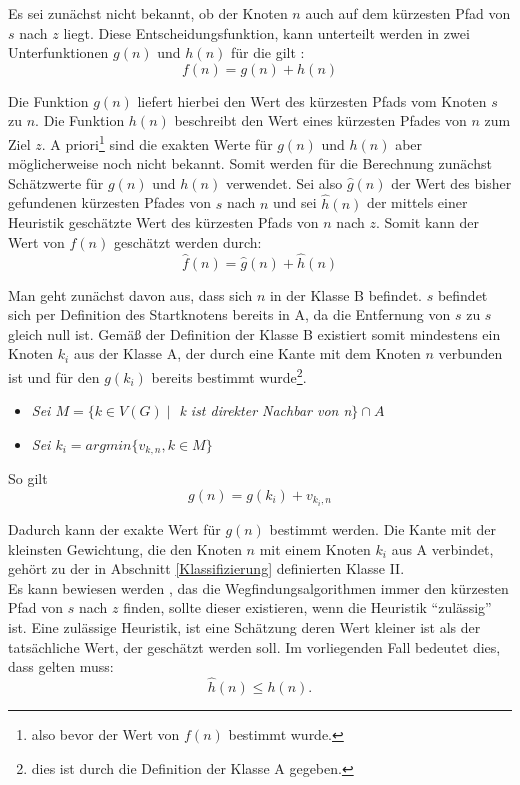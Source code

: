 		Es sei zunächst nicht bekannt, ob der Knoten $n$ auch auf dem kürzesten Pfad von $s$ nach $z$ liegt.
		Diese Entscheidungsfunktion, kann unterteilt werden in zwei Unterfunktionen $g(n)$ und $h(n)$ für die gilt \cite{Hart1968}:
		\begin{equation}
		f(n)=g(n)+h(n)
		\end{equation}
		
		Die Funktion $g(n)$ liefert hierbei den Wert des kürzesten Pfads vom Knoten $s$ zu $n$. Die Funktion $h(n)$ beschreibt den Wert eines kürzesten Pfades von $n$ zum Ziel $z$. A priori\footnote{also bevor der Wert von $f(n)$ bestimmt wurde.} sind die exakten Werte für $g(n)$ und $h(n)$ aber möglicherweise noch nicht bekannt. Somit werden für die Berechnung zunächst Schätzwerte für $g(n)$ und $h(n)$ verwendet. Sei also $\hat{g}(n)$ der Wert des bisher gefundenen kürzesten Pfades von $s$ nach $n$ und sei $\hat{h}(n)$ der mittels einer Heuristik geschätzte Wert des kürzesten Pfads von $n$ nach $z$. Somit kann der Wert von $f(n)$ geschätzt werden durch:
		\begin{equation}
			\hat{f}(n)=\hat{g}(n)+\hat{h}(n)
		\end{equation}
	
		Man geht zunächst davon aus, dass sich $n$ in der Klasse B befindet. $s$ befindet sich per Definition des Startknotens bereits in A, da die Entfernung von $s$ zu $s$ gleich null ist. Gemäß der Definition der Klasse B existiert somit mindestens ein Knoten $k_i$ aus der Klasse A, der durch eine Kante mit dem Knoten $n$ verbunden ist und für den $g(k_i)$ bereits bestimmt wurde\footnote{dies ist durch die Definition der Klasse A gegeben.}.
		\begin{itemize}
			\item \textit{Sei $M=\{k\in V(G)\mid$ k ist direkter Nachbar von n$\} \cap A$}
			\item \textit{Sei $k_i=argmin\{v_{k,n},k\in M\}$}
		\end{itemize}
		 So gilt
		\begin{equation}
			g(n)=g(k_i)+v_{k_i,n}
		\end{equation}
		
		Dadurch kann der exakte Wert für $g(n)$ bestimmt werden. Die Kante mit der kleinsten Gewichtung, die den Knoten $n$ mit einem Knoten $k_i$ aus A verbindet, gehört zu der in Abschnitt \ref{Klassifizierung} definierten Klasse II.\\
		Es kann bewiesen werden \cite{Hart1968}, das die Wegfindungsalgorithmen immer den kürzesten Pfad von $s$ nach $z$ finden, sollte dieser existieren, wenn die Heuristik "`zulässig"' ist. Eine zulässige Heuristik, ist eine Schätzung deren Wert kleiner ist als der tatsächliche Wert, der geschätzt werden soll. Im vorliegenden Fall bedeutet dies, dass gelten muss:
		\begin{equation}
			\hat{h}(n)\le h(n).
		\end{equation}
		
